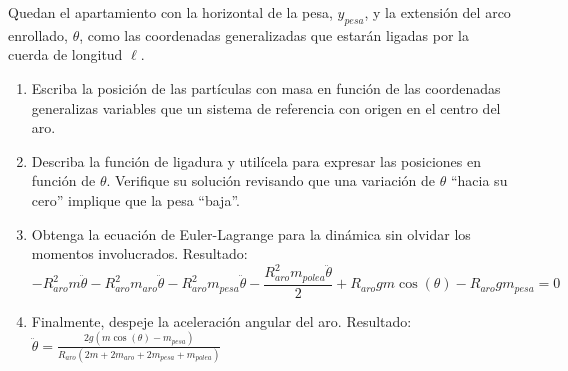 \documentclass[11pt, spanish, a4paper, twoside]{article}
\begin{document}
\begin{enumerate}
\begin{minipage}[t][6cm]{0.57\textwidth}
		Quedan el apartamiento con la horizontal de la pesa, \(y_{pesa}\), y la extensión del arco enrollado, \(\theta\), como las coordenadas generalizadas que estarán ligadas por la cuerda de longitud \(\ell\).
	\end{minipage}
	\begin{minipage}[c][1.5cm][t]{0.2\textwidth}
		
	\end{minipage}
	\begin{enumerate}
		\item Escriba la posición de las partículas con masa en función de las coordenadas generalizas variables que  un sistema de referencia con origen en el centro del aro.
		\item Describa la función de ligadura y utilícela para expresar las posiciones en función de \(\theta\).
		Verifique su solución revisando que una variación de \(\theta\) ``hacia su cero'' implique que la pesa ``baja''. 
		\item Obtenga la ecuación de Euler-Lagrange para la dinámica sin olvidar los momentos involucrados. Resultado:
		\(
			- R_{aro}^{2} m \ddot{\theta} - R_{aro}^{2} m_{aro} \ddot{\theta} - R_{aro}^{2} m_{pesa} \ddot{\theta} - \dfrac{R_{aro}^{2} m_{polea} \ddot{\theta}}{2} + R_{aro} g m \cos{\left(\theta \right)} - R_{aro} g m_{pesa} = 0
		\)
		\item Finalmente, despeje la aceleración angular del aro. Resultado:
		\(
			\ddot{\theta} = \frac{2 g \left(m \cos{\left(\theta \right)} - m_{pesa}\right)}{R_{aro} \left(2 m + 2 m_{aro} + 2 m_{pesa} + m_{polea}\right)}
		\)
	\end{enumerate}



\end{enumerate}
\end{document}
